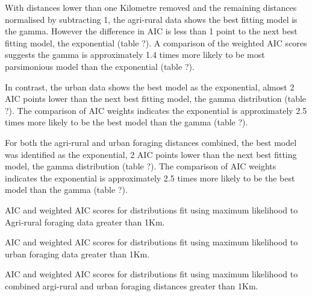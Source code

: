 \documentclass[11pt,usenames,dvipsnames,a4paper]{article}
\begin{document}
\begin{linenumbers}
\hspace{\parindent}
With distances lower than one Kilometre removed and the remaining distances normalised by subtracting 1, the agri-rural data shows the best fitting model is the gamma. However the difference in AIC is less than 1 point to the next best fitting model, the exponential (table ?). A comparison of the weighted AIC scores suggests the gamma is approximately 1.4 times more likely to be most parsimonious model than the exponential (table ?).

In contrast, the urban data shows the best model as the exponential, almost 2 AIC points lower than the next best fitting model, the gamma distribution (table ?). The comparison of AIC weights indicates the exponential is approximately 2.5 times more likely to be the best model than the gamma (table ?).

For both the agri-rural and urban foraging distances combined, the best model was identified as the exponential, 2 AIC points lower than the next best fitting model, the gamma distribution (table ?). The comparison of AIC weights indicates the exponential is approximately 2.5 times more likely to be the best model than the gamma (table ?). 
\end{linenumbers}

\begin{table}[H]
	\centering
	\caption{AIC and weighted AIC scores for distributions fit using maximum likelihood to Agri-rural foraging data greater than 1Km.}
	
\end{table}
\begin{table}[H]
	\centering
	\caption{AIC and weighted AIC scores for distributions fit using maximum likelihood to urban foraging data greater than 1Km.}
	
\end{table}
\begin{table}[H]
	\centering
	\caption{AIC and weighted AIC scores for distributions fit using maximum likelihood to combined argi-rural and urban foraging distances greater than 1Km.}
	
\end{table}
\end{document}

